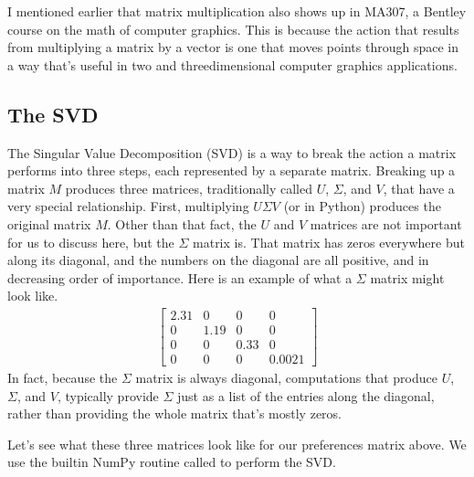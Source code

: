 \documentclass[letterpaper,10pt,english]{sphinxmanual}
\begin{document}
I mentioned earlier that matrix multiplication also shows up in MA307, a Bentley course on the math of computer graphics.  This is because the action that results from multiplying a matrix by a vector is one that moves points through space in a way that’s useful in two\sphinxhyphen{} and three\sphinxhyphen{}dimensional computer graphics applications.


\subsection{The SVD}
\label{\detokenize{chapter-16-matrices:the-svd}}
The Singular Value Decomposition (SVD) is a way to break the action a matrix performs into three steps, each represented by a separate matrix.  Breaking up a matrix \(M\) produces three matrices, traditionally called \(U\), \(\Sigma\), and \(V\), that have a very special relationship.  First, multiplying \(U\Sigma V\) (or  in Python) produces the original matrix \(M\).  Other than that fact, the \(U\) and \(V\) matrices are not important for us to discuss here, but the \(\Sigma\) matrix is.  That matrix has zeros everywhere but along its diagonal, and the numbers on the diagonal are all positive, and in decreasing order of importance.  Here is an example of what a \(\Sigma\) matrix might look like.
\begin{equation*}
\begin{split} \left[\begin{array}{cccc} 2.31 & 0 & 0 & 0 \\ 0 & 1.19 & 0 & 0 \\ 0 & 0 & 0.33 & 0 \\ 0 & 0 & 0 & 0.0021 \end{array}\right]\end{split}
\end{equation*}
In fact, because the \(\Sigma\) matrix is always diagonal, computations that produce \(U\), \(\Sigma\), and \(V\), typically provide \(\Sigma\) just as a list of the entries along the diagonal, rather than providing the whole matrix that’s mostly zeros.

Let’s see what these three matrices look like for our preferences matrix above.  We use the built\sphinxhyphen{}in NumPy routine called  to perform the SVD.

\begin{sphinxVerbatim}[commandchars=\\\{\}]
      
\end{sphinxVerbatim}
\end{document}
